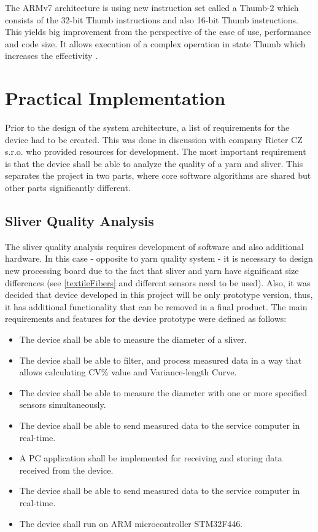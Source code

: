 \documentclass[twoside]{ctuthesis}
\theoremstyle{plain}
\theoremstyle{definition}
\theoremstyle{note}
\begin{document}
The ARMv7 architecture is using new instruction set called a Thumb-2 which consists of the 32-bit Thumb instructions and also 16-bit Thumb instructions. This yields big improvement from the perspective of the ease of use, performance and code size. It allows execution of a complex operation in state Thumb which increases the effectivity \cite{cite:ARM-M3}.

\chapter{Practical Implementation}
Prior to the design of the system architecture, a list of requirements for the device had to be created. This was done in discussion with company Rieter CZ s.r.o. who provided resources for development. The most important requirement is that the device shall be able to analyze the quality of a yarn and sliver. This separates the project in two parts, where core software algorithms are shared but other parts significantly different. 

\section{Sliver Quality Analysis}
 The sliver quality analysis requires development of software and also additional hardware. In this case - opposite to yarn quality system - it is necessary to design new processing board due to the fact that sliver and yarn have significant size differences (see \ref{textileFibers} and different sensors need to be used). Also, it was decided that device developed in this project will be only prototype version, thus, it has additional functionality that can be removed in a final product. The main requirements and features for the device prototype were defined as follows:
\begin{itemize}
	\setlength{\itemsep}{5pt}
	\item The device shall be able to measure the diameter of a sliver.
	\item The device shall be able to filter, and process measured data in a way that allows calculating CV\% value and Variance-length Curve.
	\item The device shall be able to measure the diameter with one or more specified sensors simultaneously.
	\item The device shall be able to send measured data to the service computer in real-time.
	\item A PC application shall be implemented for receiving and storing data received from the device.
	\item The device shall be able to send measured data to the service computer in real-time.
	\item The device shall run on ARM microcontroller STM32F446.
\end{itemize}
\end{document}
